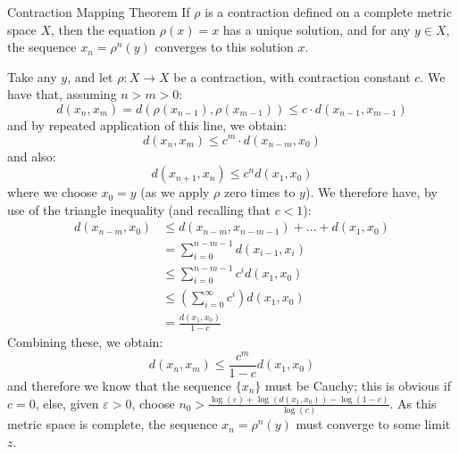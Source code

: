 \begin{btheorem}{Contraction Mapping Theorem}{}
If $\rho$ is a contraction defined on a complete metric space $X$, then the equation $\rho(x) = x$ has a unique solution, and for any $y \in X$, the sequence $x_{n} = \rho^{n}(y)$ converges to this solution $x$.
\end{btheorem}
\begin{bproof}{}{}
Take any $y$, and let $\rho : X \to X$ be a contraction, with contraction constant $c$. We have that, assuming $n>m>0$: \[d(x_{n},x_{m}) = d( \rho(x_{n-1}), \rho(x_{m-1}) ) \leq c \cdot d(x_{n-1}, x_{m-1}) \]
and by repeated application of this line, we obtain:
\begin{equation}
    d(x_{n},x_{m}) \leq c^{m} \cdot d(x_{n-m}, x_{0} )
\end{equation}
and also:
\begin{equation}
    d(x_{n+1},x_{n}) \leq c^{n} d(x_{1},x_{0})
\end{equation}
where we choose $x_{0}=y$ (as we apply $\rho$ zero times to $y$). We therefore have, by use of the triangle inequality (and recalling that $c<1$):
\begin{equation}
\begin{split}
    d(x_{n-m}, x_{0} ) &\leq d(x_{n-m}, x_{n-m-1}) + \ldots + d(x_{1},x_{0}) \\
     &= \sum_{i=0}^{n-m -1} d(x_{i-1},x_{i}) \\
     &\leq \sum_{i=0}^{n-m -1} c^{i} d(x_{1},x_{0}) \\
     &\leq \left( \sum_{i=0}^{\infty} c^{i} \right) d(x_{1},x_{0}) \\
     &= \frac{d(x_{1},x_{0})}{1-c}
\end{split}
\end{equation}
Combining these, we obtain:
\begin{equation}
     d(x_{n},x_{m}) \leq \frac{c^{m}}{1-c} d(x_{1},x_{0})
\end{equation}
and therefore we know that the sequence $\{ x_{n} \}$ must be Cauchy; this is obvious if $c=0$, else, given $\varepsilon > 0$, choose \mbox{$n_{0} > \frac{\log(\varepsilon) + \log(d(x_{1},x_{0})) - \log(1-c)}{\log(c)}$}. As this metric space is complete, the sequence \mbox{$x_{n} = \rho^{n}(y)$} must converge to some limit $z$.


\end{bproof}

